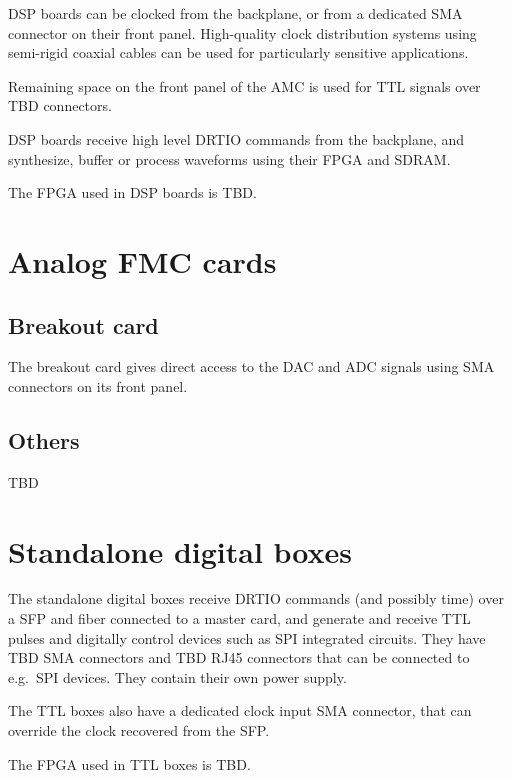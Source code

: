 \documentclass[11pt]{paper}
\begin{document}
DSP boards can be clocked from the backplane, or from a dedicated SMA connector on their front panel. High-quality clock distribution systems using semi-rigid coaxial cables can be used for particularly sensitive applications.

Remaining space on the front panel of the AMC is used for TTL signals over TBD connectors.

DSP boards receive high level DRTIO commands from the backplane, and synthesize, buffer or process waveforms using their FPGA and SDRAM.

The FPGA used in DSP boards is TBD.

\section{Analog FMC cards}
\subsection{Breakout card}
The breakout card gives direct access to the DAC and ADC signals using SMA connectors on its front panel.

\subsection{Others}
TBD

\section{Standalone digital boxes}
The standalone digital boxes receive DRTIO commands (and possibly time) over a SFP and fiber connected to a master card, and generate and receive TTL pulses and digitally control devices such as SPI integrated circuits. They have TBD SMA connectors and TBD RJ45 connectors that can be connected to e.g.\ SPI devices. They contain their own power supply.

The TTL boxes also have a dedicated clock input SMA connector, that can override the clock recovered from the SFP.

The FPGA used in TTL boxes is TBD.
\end{document}
